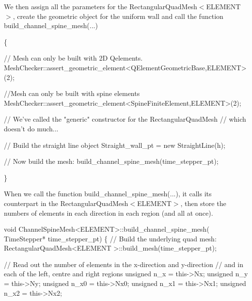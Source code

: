 We then assign all the parameters for the {\ttfamily Rectangular\+Quad\+Mesh$<$\+E\+L\+E\+M\+E\+N\+T$>$}, create the geometric object for the uniform wall and call the function {\ttfamily build\+\_\+channel\+\_\+spine\+\_\+mesh}(...)


\begin{DoxyCodeInclude}
\{

 \textcolor{comment}{// Mesh can only be built with 2D Qelements.}
 MeshChecker::assert\_geometric\_element<QElementGeometricBase,ELEMENT>(2);

 \textcolor{comment}{//Mesh can only be built with spine elements}
 MeshChecker::assert\_geometric\_element<SpineFiniteElement,ELEMENT>(2);

 \textcolor{comment}{// We've called the "generic" constructor for the RectangularQuadMesh}
 \textcolor{comment}{// which doesn't do much...}

 \textcolor{comment}{// Build the straight line object}
 Straight\_wall\_pt = \textcolor{keyword}{new} StraightLine(h);

 \textcolor{comment}{// Now build the mesh: }
 build\_channel\_spine\_mesh(time\_stepper\_pt);

\}

\end{DoxyCodeInclude}


When we call the function {\ttfamily build\+\_\+channel\+\_\+spine\+\_\+mesh}(...), it calls its counterpart in the {\ttfamily Rectangular\+Quad\+Mesh$<$\+E\+L\+E\+M\+E\+N\+T$>$}, then store the numbers of elements in each direction in each region (and all at once).

 
\begin{DoxyCodeInclude}
\textcolor{keywordtype}{void} ChannelSpineMesh<ELEMENT>::build\_channel\_spine\_mesh(
 TimeStepper* time\_stepper\_pt) 
\{
 \textcolor{comment}{// Build the underlying quad mesh: }
 RectangularQuadMesh<ELEMENT >::build\_mesh(time\_stepper\_pt);

 \textcolor{comment}{// Read out the number of elements in the x-direction and y-direction}
 \textcolor{comment}{// and in each of the left, centre and right regions}
 \textcolor{keywordtype}{unsigned} n\_x = this->Nx;
 \textcolor{keywordtype}{unsigned} n\_y = this->Ny;
 \textcolor{keywordtype}{unsigned} n\_x0 = this->Nx0;
 \textcolor{keywordtype}{unsigned} n\_x1 = this->Nx1;
 \textcolor{keywordtype}{unsigned} n\_x2 = this->Nx2;

\end{DoxyCodeInclude}


